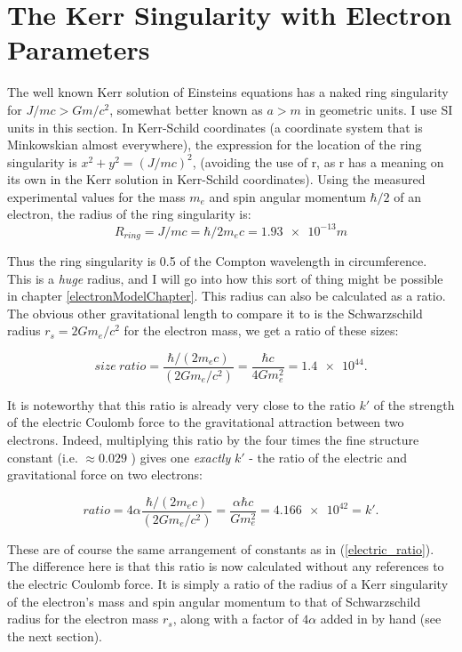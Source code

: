 \documentclass[../rzero]{subfiles}
\begin{document}
\section{The Kerr Singularity with Electron Parameters}
The well known Kerr solution of Einsteins equations has a naked ring singularity for $J/mc > Gm/c^2$, somewhat better known as $a > m$ in geometric units. I use SI units in this section. In Kerr-Schild coordinates (a coordinate system that is Minkowskian almost everywhere)\cite{Visser2008}, the expression for the location of the ring singularity is $x^2 + y^2 = (J/mc)^2$, (avoiding the use of r, as r has a meaning on its own in the Kerr solution in Kerr-Schild coordinates). Using the measured experimental values for the mass $m_e$ and spin angular momentum $\hbar/2$ of an electron, the radius of the ring singularity is:
\begin{equation} \label{radius_eqn}
	R_{ring} = J/mc = \hbar/2m_ec = \num{1.93e-13}m
\end{equation}

Thus the ring singularity is 0.5 of the Compton wavelength in circumference. This is a \textit{huge} radius, and I will go into how this sort of thing might be possible in chapter \ref{electronModelChapter}. This radius can also be calculated as a ratio. The obvious other gravitational length to compare it to is the Schwarzschild radius $r_s = 2Gm_e/c^2$ for the electron mass, we get a ratio of these sizes:

\begin{equation}
	size \ ratio = \frac{\hbar/(2m_ec)}{(2Gm_e/c^2)} = \frac{\hbar c}{4G m_e^2} = \num{1.4e44}.
\end{equation}

 It is noteworthy that this ratio is already very close to the ratio $k'$ of the strength of the electric Coulomb force to the gravitational attraction between two electrons. Indeed, multiplying this ratio by the four times the fine structure constant (i.e. $\approx 0.029 $ ) gives one \textit{exactly} $k'$ - the ratio of the electric and gravitational force on two electrons:
 
\begin{equation}
	ratio = 4\alpha \frac{\hbar/(2m_ec)}{(2Gm_e/c^2)} = \frac{\alpha \hbar c}{G m_e^2} = \num{4.166e42} = k'.
\end{equation}


These are of course the same arrangement of constants as in (\ref{electric_ratio}). The difference here is that this ratio is now calculated without any references to the electric Coulomb force. It is simply a ratio of the radius of a Kerr singularity of the electron's mass and spin angular momentum to that of Schwarzschild radius for the electron mass $r_s$, along with a factor of $4\alpha$ added in by hand (see the next section). 
\end{document}
